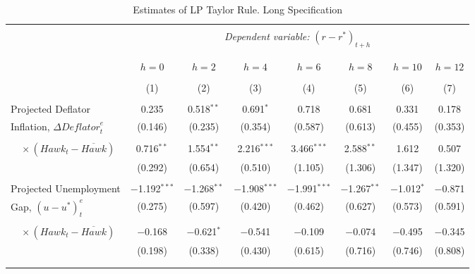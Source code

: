 \documentclass[11pt]{article}
\begin{document}
\begin{table}[!htbp] \centering \footnotesize
  \begin{threeparttable} \centering
    \caption{Estimates of LP Taylor Rule. Long Specification} 
    \label{tab:LP_long} 
    \begin{tabular}{@{\extracolsep{5pt}}lccccccc} 
      \\[-1.8ex]\hline 
      \hline \\[-1.8ex] 
      & \multicolumn{7}{c}{\textit{Dependent variable:} $\left(r-r^*\right)_{t+h}$} \\  
      \\[-1.8ex]
      \cline{2-8} 
      \\[-1.8ex] & $h=0$ & $h=2$ & $h=4$ & $h=6$ & $h=8$ & $h=10$ & $h=12$ \\ 
      \\[-1.8ex] & (1) & (2) & (3) & (4) & (5) & (6) & (7)\\ 
      \hline \\[-1.8ex] 
      Projected Deflator & 0.235 & 0.518$^{**}$ & 0.691$^{*}$ & 0.718 & 0.681 & 0.331 & 0.178 \\ 
      Inflation, $\Delta\mathit{Deflator}_t^e$  & (0.146) & (0.235) & (0.354) & (0.587) & (0.613) & (0.455) & (0.353) \\
      & & & & & & & \\ 
      $\quad \times \left(\mathit{Hawk}_t-\overline{\mathit{Hawk}}\right)$  & 0.716$^{**}$ & 1.554$^{**}$ & 2.216$^{***}$ & 3.466$^{***}$ & 2.588$^{**}$ & 1.612 & 0.507 \\ 
      & (0.292) & (0.654) & (0.510) & (1.105) & (1.306) & (1.347) & (1.320) \\ 
      & & & & & & & \\ 
      Projected Unemployment  &  $-$1.192$^{***}$ & $-$1.268$^{**}$ & $-$1.908$^{***}$ & $-$1.991$^{***}$ & $-$1.267$^{**}$ & $-$1.012$^{*}$ & $-$0.871 \\
      Gap, $\left(u-u^*\right)_t^e$  & (0.275) & (0.597) & (0.420) & (0.462) & (0.627) & (0.573) & (0.591) \\ 
      & & & & & & & \\ 
      $\quad \times \left(\mathit{Hawk}_t-\overline{\mathit{Hawk}}\right)$& $-$0.168 & $-$0.621$^{*}$ & $-$0.541 & $-$0.109 & $-$0.074 & $-$0.495 & $-$0.345 \\ 
      & (0.198) & (0.338) & (0.430) & (0.615) & (0.716) & (0.746) & (0.808) \\
      & & & & & & & \\ 
      \hline \\[-1.8ex] 

\end{tabular}
\end{threeparttable}
\end{table}
\end{document}
